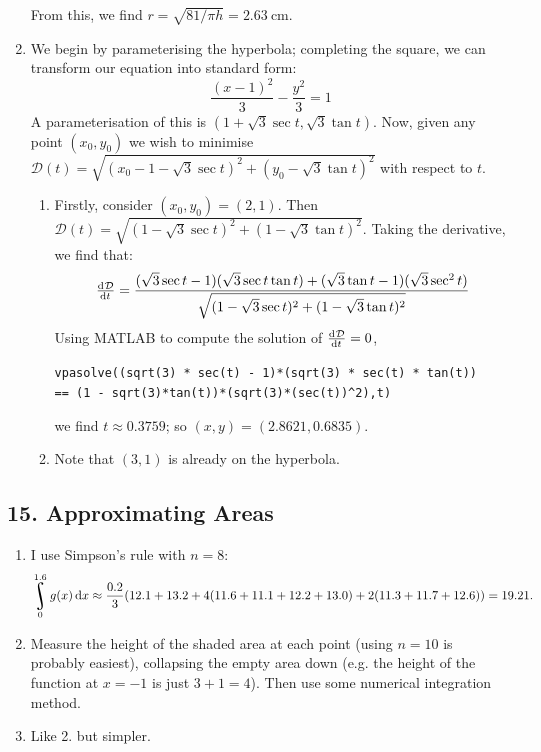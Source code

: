 \begin{enumerate}
\begin{displaymath}
        \end{displaymath}
        From this, we find $ r = \sqrt{81/\pi h} = \SI{2.63}{\centi\metre} $.
  \item We begin by parameterising the hyperbola; completing the square, we can transform our equation into standard form:
        \begin{displaymath}
          \frac{(x - 1)^2}{3}  - \frac{y^2}{3} = 1
        \end{displaymath}
        A parameterisation of this is $ (1 + \sqrt{3} \sec t, \sqrt{3} \tan t) $. Now, given any point $ (x_0, y_0) $ we wish
        to minimise $ \mathcal{D}(t) = \sqrt{(x_0 - 1 - \sqrt{3} \sec t)^2 + (y_0 - \sqrt{3} \tan t)^2} $ with respect to $ t $.

        \begin{enumerate}
          \item Firstly, consider $ (x_0, y_0) = (2,1) $. Then $ \mathcal{D}(t) = \sqrt{(1 - \sqrt{3}\sec t)^2 + (1 - \sqrt{3} \tan t)^2} $.
                Taking the derivative, we find that:
                \begin{displaymath}
                  \od{\mathcal{D}}{t} = \frac{(\sqrt{3}\sec t - 1)(\sqrt{3}\sec t \tan t) + (\sqrt{3}\tan t - 1)(\sqrt{3}\sec^2 t)}{\sqrt{(1 - \sqrt{3}\sec t)^2 + (1 - \sqrt{3} \tan t)^2}}
                \end{displaymath}
                Using MATLAB to compute the solution of $ \od{\mathcal{D}}{t} = 0 $,
                \begin{center}
                  \verb|vpasolve((sqrt(3) * sec(t) - 1)*(sqrt(3) * sec(t) * tan(t))|\\
                  \qquad\verb|== (1 - sqrt(3)*tan(t))*(sqrt(3)*(sec(t))^2),t)|
                \end{center}
                we find $ t \approx 0.3759 $; so $ (x, y) = (2.8621, 0.6835) $.
            \item Note that $ (3,1) $ is already on the hyperbola. \Innocey
        \end{enumerate}
\end{enumerate}

\subsection*{15. Approximating Areas}
\begin{enumerate}
  \item I use Simpson's rule with $ n = 8 $:
        \begin{displaymath}
          \rint^{1.6}_0 g(x) \dif{x} \approx \frac{0.2}{3} (12.1 + 13.2 + 4(11.6 + 11.1 + 12.2 + 13.0) + 2(11.3 + 11.7 + 12.6)) = 19.21.
        \end{displaymath}
  \item Measure the height of the shaded area at each point (using $ n = 10 $ is probably easiest), collapsing the empty area down (e.g. the height
        of the function at $ x = -1 $ is just $ 3 + 1 = 4 $). Then use some numerical integration method.
  \item Like 2. but simpler.
\end{enumerate}

